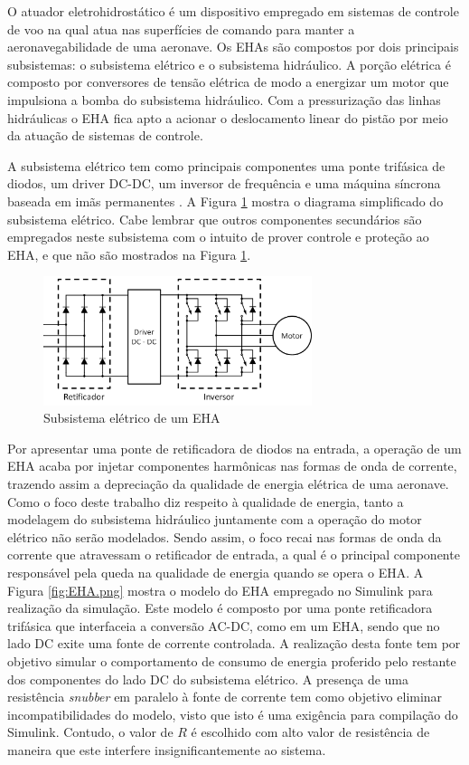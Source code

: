 O atuador eletrohidrostático é um dispositivo empregado em sistemas de controle de voo na qual atua nas superfícies de comando para manter a aeronavegabilidade de uma aeronave. Os EHAs são compostos por dois principais subsistemas: o subsistema elétrico e o subsistema hidráulico. A porção elétrica é composto por conversores de tensão elétrica de modo a energizar um motor que impulsiona a bomba do subsistema hidráulico. Com a pressurização das linhas hidráulicas o EHA fica apto a acionar o deslocamento linear do pistão por meio da atuação de sistemas de controle.

A subsistema elétrico tem como principais componentes uma ponte trifásica de diodos, um driver DC-DC, um inversor de frequência e uma máquina síncrona baseada em imãs permanentes \cite{Dinca2014}. A Figura \ref{fig:EHA_elec.png} mostra o diagrama simplificado do subsistema elétrico. Cabe lembrar que outros componentes secundários são empregados neste subsistema com o intuito de prover controle e proteção ao EHA, e que não são mostrados na Figura \ref{fig:EHA_elec.png}.

\begin{figure}[!htb] %
	\centering
	\includegraphics[width=0.7\textwidth]{Cap4/Figuras/EHA_elec.png}
	\caption{Subsistema elétrico de um EHA}
	\label{fig:EHA_elec.png}
\end{figure}  

Por apresentar uma ponte de retificadora de diodos na entrada, a operação de um EHA acaba por injetar componentes harmônicas nas formas de onda de corrente, trazendo assim a depreciação da qualidade de energia elétrica de uma aeronave. Como o foco deste trabalho diz respeito à qualidade de energia, tanto a modelagem do subsistema hidráulico juntamente com a operação do motor elétrico não serão modelados. Sendo assim, o foco recai nas formas de onda da corrente que atravessam o retificador de entrada, a qual é o principal componente responsável pela queda na qualidade de energia quando se opera o EHA. A Figura \ref{fig:EHA.png} mostra o modelo do EHA empregado no Simulink para realização da simulação. Este modelo é composto por uma ponte retificadora trifásica que interfaceia a conversão AC-DC, como em um EHA, sendo que no lado DC exite uma fonte de corrente controlada. A realização desta fonte tem por objetivo simular o comportamento de consumo de energia proferido pelo restante dos componentes do lado DC do subsistema elétrico. A presença de uma resistência \textit{snubber} em paralelo à fonte de corrente tem como objetivo eliminar incompatibilidades do modelo, visto que isto é uma exigência para compilação do Simulink. Contudo, o valor de $R$ é escolhido com alto valor de resistência de maneira que este interfere insignificantemente ao sistema.


